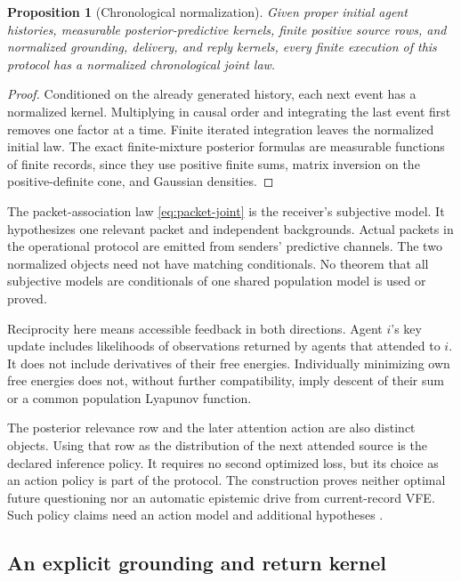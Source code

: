 \documentclass[11pt]{article}
\newtheorem{proposition}[theorem]{Proposition}
\theoremstyle{definition}
\theoremstyle{remark}
\begin{document}
\begin{proposition}[Chronological normalization]
Given proper initial agent histories, measurable posterior-predictive kernels, finite positive source rows, and normalized grounding, delivery, and reply kernels, every finite execution of this protocol has a normalized chronological joint law.
\end{proposition}
\begin{proof}
Conditioned on the already generated history, each next event has a normalized kernel. Multiplying in causal order and integrating the last event first removes one factor at a time. Finite iterated integration leaves the normalized initial law. The exact finite-mixture posterior formulas are measurable functions of finite records, since they use positive finite sums, matrix inversion on the positive-definite cone, and Gaussian densities.
\end{proof}

The packet-association law \eqref{eq:packet-joint} is the receiver's subjective model. It hypothesizes one relevant packet and independent backgrounds. Actual packets in the operational protocol are emitted from senders' predictive channels. The two normalized objects need not have matching conditionals. No theorem that all subjective models are conditionals of one shared population model is used or proved.

Reciprocity here means accessible feedback in both directions. Agent \(i\)'s key update includes likelihoods of observations returned by agents that attended to \(i\). It does not include derivatives of their free energies. Individually minimizing own free energies does not, without further compatibility, imply descent of their sum or a common population Lyapunov function.

The posterior relevance row and the later attention action are also distinct objects. Using that row as the distribution of the next attended source is the declared inference policy. It requires no second optimized loss, but its choice as an action policy is part of the protocol. The construction proves neither optimal future questioning nor an automatic epistemic drive from current-record VFE. Such policy claims need an action model and additional hypotheses \citep{Millidge2021}.

\subsection{An explicit grounding and return kernel}
\end{document}
